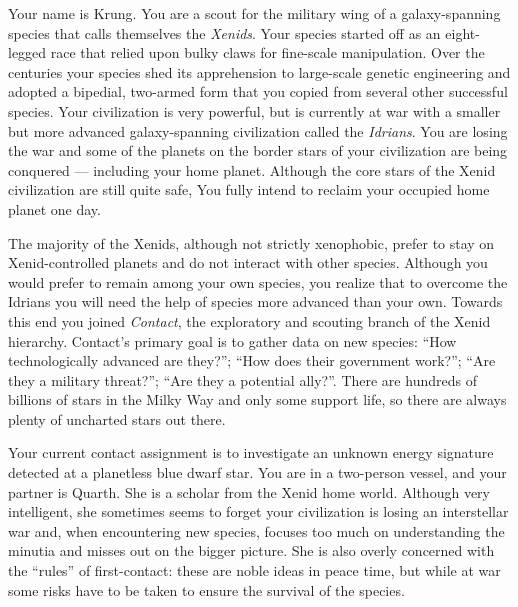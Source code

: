 \documentclass[char]{guildcamp1}
\begin{document}
\name{\cActive{}}


Your name is Krung. You are a scout for the military wing of a galaxy-spanning species that calls themselves the \emph{Xenids}. Your species started off as an eight-legged race that relied upon bulky claws for fine-scale manipulation. Over the centuries your species shed its apprehension to large-scale genetic engineering and adopted a bipedial, two-armed form that you copied from several other successful species. Your civilization is very powerful, but is currently at war with a smaller but more advanced galaxy-spanning civilization called the \emph{Idrians}. You are losing the war and some of the planets on the border stars of your civilization are being conquered --- including your home planet. Although the core stars of the Xenid civilization are still quite safe, You fully intend to reclaim your occupied home planet one day.

The majority of the Xenids, although not strictly xenophobic, prefer to stay on Xenid-controlled planets and do not interact with other species. Although you would prefer to remain among your own species, you realize that to overcome the Idrians you will need the help of species more advanced than your own. Towards this end you joined \emph{Contact}, the exploratory and scouting branch of the Xenid hierarchy. Contact's primary goal is to gather data on new species: ``How technologically advanced are they?''; ``How does their government work?''; ``Are they a military threat?''; ``Are they a potential ally?''. There are hundreds of billions of stars in the Milky Way and only some support life, so there are always plenty of uncharted stars out there.

Your current contact assignment is to investigate an unknown energy signature detected at a planetless blue dwarf star. You are in a two-person vessel, and your partner is Quarth. She is a scholar from the Xenid home world. Although very intelligent, she sometimes seems to forget your civilization is losing an interstellar war and, when encountering new species, focuses too much on understanding the minutia and misses out on the bigger picture. She is also overly concerned with the ``rules'' of first-contact: these are noble ideas in peace time, but while at war some risks have to be taken to ensure the survival of the species.
\end{document}

